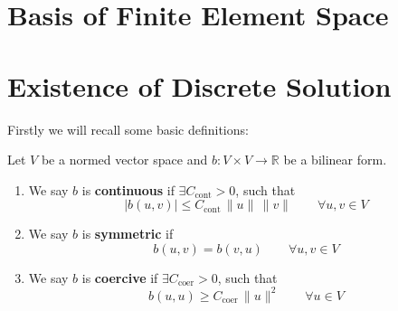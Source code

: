 \section{Basis of Finite Element Space}
\section{Existence of Discrete Solution}
Firstly we will recall some basic definitions:
\begin{definition} Let $V$ be a normed vector space and $b:V\times V \to \mathbb{R}$
    be a bilinear form.
    \begin{enumerate}[label=\textnormal{(\roman*)}]
        \item We say $b$ is \textbf{continuous} if $\exists C_{\text{cont}}>0$, such that
        \[
            |b(u,v)|\leq C_{\text{cont}}\, \|u\|\, \|v\| \qquad \forall u,v \in V
        \]
        \item We say $b$ is \textbf{symmetric} if 
        \[  
            b(u,v) = b(v,u) \qquad \forall u,v \in V
        \]
        \item We say $b$ is \textbf{coercive} if $\exists C_{\text{coer}}>0$, such that
        \[
            b(u,u)\geq C_{\text{coer}}\, \|u\|^2 \qquad \forall u \in V
        \]
    \end{enumerate}
    
\end{definition}


